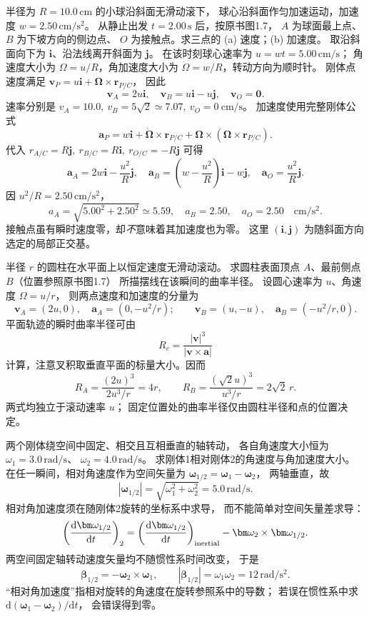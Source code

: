 半径为 $R=10.0\,\mathrm{cm}$ 的小球沿斜面无滑动滚下，
球心沿斜面作匀加速运动，加速度 $w=2.50\,\mathrm{cm/s^2}$。
从静止出发 $t=2.00\,\mathrm s$ 后，按原书图1.7，
$A$ 为球面最上点、$B$ 为下坡方向的侧边点、
$O$ 为接触点。求三点的 (a) 速度；(b) 加速度。
\exsolution
取沿斜面向下为 $\bm i$、沿法线离开斜面为 $\bm j$。
在该时刻球心速率为
$u=wt=5.00\,\mathrm{cm/s}$；
角速度大小为 $\Omega=u/R$，角加速度大小为
$\dot\Omega=w/R$，转动方向为顺时针。
刚体点速度满足
$\bm v_P=u\bm i+\bm\Omega\times\bm r_{P/C}$，
因此
\[
 \boxed{\bm v_A=2u\bm i,\quad
 \bm v_B=u\bm i-u\bm j,\quad
 \bm v_O=\bm0.}
\]
速率分别是
$\boxed{v_A=10.0,\ v_B=5\sqrt2\simeq7.07,\ v_O=0\
 \mathrm{cm/s}}$。
加速度使用完整刚体公式
\[
 \bm a_P=w\bm i+
 \dot{\bm\Omega}\times\bm r_{P/C}
 +\bm\Omega\times(\bm\Omega\times\bm r_{P/C}).
\]
代入 $r_{A/C}=R\bm j,\ r_{B/C}=R\bm i,\
r_{O/C}=-R\bm j$ 可得
\[
 \boxed{\bm a_A=2w\bm i-\frac{u^2}{R}\bm j,\quad
 \bm a_B=\left(w-\frac{u^2}{R}\right)\bm i-w\bm j,\quad
 \bm a_O=\frac{u^2}{R}\bm j.}
\]
因 $u^2/R=2.50\,\mathrm{cm/s^2}$，
\[
 \boxed{a_A=\sqrt{5.00^2+2.50^2}\simeq5.59,\quad
 a_B=2.50,\quad a_O=2.50\quad\mathrm{cm/s^2}.}
\]
\excheck 接触点虽有瞬时速度零，却\emph{不}意味着其加速度也为零。
这里 $(\bm i,\bm j)$ 为随斜面方向选定的局部正交基。

半径 $r$ 的圆柱在水平面上以恒定速度无滑动滚动。
求圆柱表面顶点 $A$、最前侧点 $B$（位置参照原书图1.7）
所描摆线在该瞬间的曲率半径。
\exsolution
设圆心速率为 $u$、角速度 $\Omega=u/r$，
则两点速度和加速度的分量为
\[
 \bm v_A=(2u,0),\quad
 \bm a_A=(0,-u^2/r);
\qquad
 \bm v_B=(u,-u),\quad
 \bm a_B=(-u^2/r,0).
\]
平面轨迹的瞬时曲率半径可由
\[
 R_c=\frac{|\bm v|^3}{|\bm v\times\bm a|}
\]
计算，注意叉积取垂直平面的标量大小。因而
\[
 \boxed{R_A=\frac{(2u)^3}{2u^3/r}=4r,\qquad
 R_B=\frac{(\sqrt2u)^3}{u^3/r}=2\sqrt2\,r.}
\]
\excheck 两式均独立于滚动速率 $u$；
固定位置处的曲率半径仅由圆柱半径和点的位置决定。

两个刚体绕空间中固定、相交且互相垂直的轴转动，
各自角速度大小恒为 $\omega_1=3.0\,\mathrm{rad/s}$、
$\omega_2=4.0\,\mathrm{rad/s}$。
求刚体1相对刚体2的角速度与角加速度大小。
\exsolution
在任一瞬间，相对角速度作为空间矢量为
$\bm\omega_{1/2}=\bm\omega_1-\bm\omega_2$，
两轴垂直，故
\[
 \boxed{|\bm\omega_{1/2}|=
 \sqrt{\omega_1^2+\omega_2^2}=5.0\,\mathrm{rad/s}.}
\]
相对角加速度须在随刚体2旋转的坐标系中求导，
而不能简单对空间矢量差求导：
\[
 \left(\frac{\mathrm d\bm\omega_{1/2}}{\mathrm dt}\right)_2
 =\left(\frac{\mathrm d\bm\omega_{1/2}}{\mathrm dt}\right)_{\rm inertial}
  -\bm\omega_2\times\bm\omega_{1/2}.
\]
两空间固定轴转动速度矢量均不随惯性系时间改变，
于是
\[
 \bm\beta_{1/2}=-\bm\omega_2\times\bm\omega_1,\qquad
 \boxed{|\bm\beta_{1/2}|=\omega_1\omega_2
 =12\,\mathrm{rad/s^2}.}
\]
\excheck “相对角加速度”指相对旋转的角速度在旋转参照系中的导数；
若误在惯性系中求 $\mathrm d(\bm\omega_1-\bm\omega_2)/\mathrm dt$，
会错误得到零。

